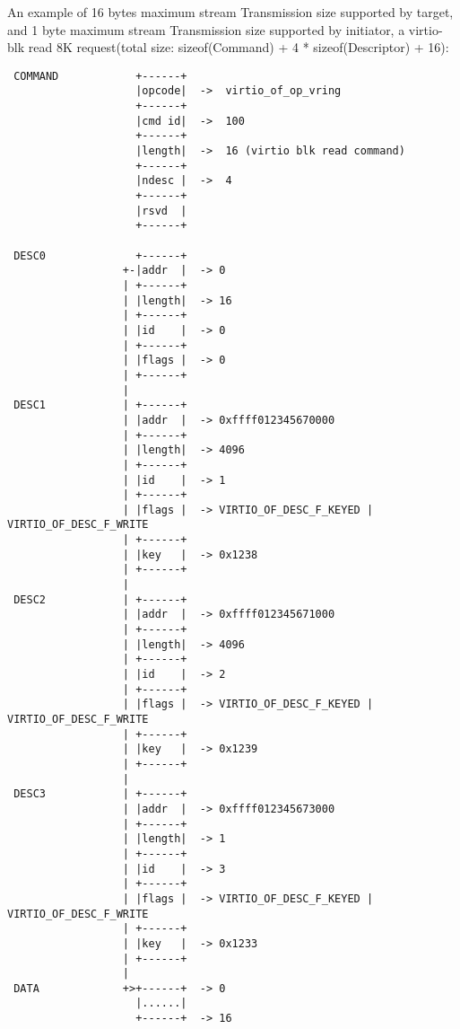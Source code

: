 An example of 16 bytes maximum stream Transmission size supported by target,
and 1 byte maximum stream Transmission size supported by initiator, a virtio-blk
read 8K request(total size: sizeof(Command) + 4 * sizeof(Descriptor) + 16):
\begin{lstlisting}
 COMMAND            +------+
                    |opcode|  ->  virtio_of_op_vring
                    +------+
                    |cmd id|  ->  100
                    +------+
                    |length|  ->  16 (virtio blk read command)
                    +------+
                    |ndesc |  ->  4
                    +------+
                    |rsvd  |
                    +------+

 DESC0              +------+
                  +-|addr  |  -> 0
                  | +------+
                  | |length|  -> 16
                  | +------+
                  | |id    |  -> 0
                  | +------+
                  | |flags |  -> 0
                  | +------+
                  |
 DESC1            | +------+
                  | |addr  |  -> 0xffff012345670000
                  | +------+
                  | |length|  -> 4096
                  | +------+
                  | |id    |  -> 1
                  | +------+
                  | |flags |  -> VIRTIO_OF_DESC_F_KEYED | VIRTIO_OF_DESC_F_WRITE
                  | +------+
                  | |key   |  -> 0x1238
                  | +------+
                  |
 DESC2            | +------+
                  | |addr  |  -> 0xffff012345671000
                  | +------+
                  | |length|  -> 4096
                  | +------+
                  | |id    |  -> 2
                  | +------+
                  | |flags |  -> VIRTIO_OF_DESC_F_KEYED | VIRTIO_OF_DESC_F_WRITE
                  | +------+
                  | |key   |  -> 0x1239
                  | +------+
                  |
 DESC3            | +------+
                  | |addr  |  -> 0xffff012345673000
                  | +------+
                  | |length|  -> 1
                  | +------+
                  | |id    |  -> 3
                  | +------+
                  | |flags |  -> VIRTIO_OF_DESC_F_KEYED | VIRTIO_OF_DESC_F_WRITE
                  | +------+
                  | |key   |  -> 0x1233
                  | +------+
                  |
 DATA             +>+------+  -> 0
                    |......|
                    +------+  -> 16
\end{lstlisting}

